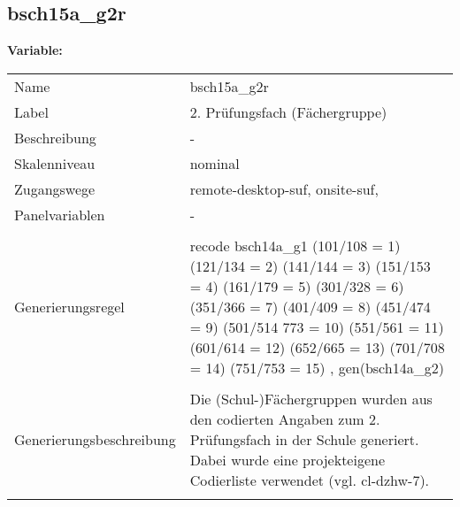 	
	
	\subsection{bsch15a\_g2r}
	\label{subSection:bsch15a_g2r}

	\noindent\textbf{Variable:}\\
		\begin{tabular}{lL{11.3cm}}
			\label{tableVariable:bsch15a_g2r}
			Name & bsch15a\_g2r \\
			Label & 2. Prüfungsfach (Fächergruppe) \\
			Beschreibung & - \\
			Skalenniveau & nominal \\
			Zugangswege &
				remote-desktop-suf,
				onsite-suf,
 \\
			Panelvariablen & -
			 \\
			 \\
					Generierungsregel & recode bsch14a\_g1 (101/108 = 1) (121/134 = 2) (141/144 = 3) 
(151/153 = 4) (161/179 = 5) (301/328 = 6) (351/366 = 7) 
(401/409 = 8) (451/474 = 9) (501/514 773 = 10) (551/561 = 11) 
(601/614 = 12) (652/665 = 13) (701/708 = 14) (751/753 = 15)
, gen(bsch14a\_g2) \\
				 \\
					Generierungsbeschreibung & Die (Schul-)Fächergruppen wurden aus den codierten Angaben zum 2. Prüfungsfach in der Schule generiert. Dabei wurde eine projekteigene Codierliste verwendet (vgl. cl-dzhw-7).
				 \\	
			 \\
		\end{tabular}






